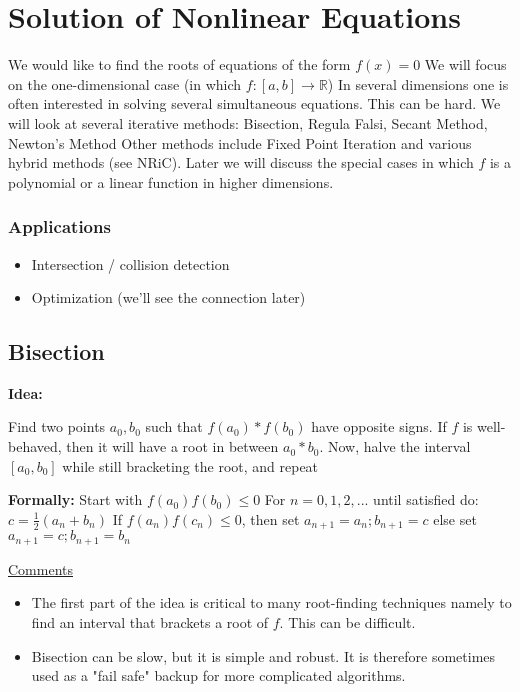     \chapter{Solution of Nonlinear Equations}
    We would like to find the roots of equations of the form $f(x) = 0$
    We will focus on the one-dimensional case (in which $f:[a, b] \rightarrow \mathbb{R}$)
    In several dimensions one is often interested in solving several simultaneous equations.
    This can be hard.
    We will look at several iterative methods: Bisection, Regula Falsi, Secant Method, Newton's Method
    Other methods include Fixed Point Iteration and various hybrid methods (see NRiC). 
    Later we will discuss the special cases in which $f$ is a polynomial or a linear function in higher dimensions. 
    \subsection*{Applications}
    \begin{itemize}
        \item Intersection / collision detection
        \item Optimization (we'll see the connection later)
    \end{itemize}
    
    \section{Bisection}
    \textbf{Idea:}
        \begin{description}
            \item Find two points $a_0, b_0$ such that $f(a_0) * f(b_0)$ have opposite signs. 
            If $f$ is well-behaved, then it will have a root in between $a_0 * b_0$. 
            Now, halve the interval $[a_0, b_0]$ while still bracketing the root, and repeat
        \end{description}
    
    \textbf{Formally:}
    Start with $f(a_0)f(b_0) \leq 0$
    For $n = 0, 1, 2, ...$ until satisfied do:
    $c = \frac{1}{2}(a_n + b_n)$
    If $f(a_n)f(c_n) \leq 0$, then set $a_{n+1} = a_n; b_{n+1} = c$
    else set $a_{n+1} = c; b_{n+1} = b_n$
    
    
    \noindent \underline{Comments}
    \begin{itemize}
        \item The first part of the idea is critical to many root-finding techniques namely to find an interval that brackets a root of $f$. 
        This can be difficult.
        \item Bisection can be slow, but it is simple and robust. 
        It is therefore sometimes used as a "fail safe" backup for more complicated algorithms. 
    \end{itemize}

